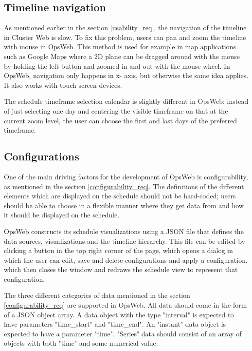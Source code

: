 \subsection{Timeline navigation} \label{opsweb_nav}
As mentioned earlier in the section \ref{usability_req}, the navigation of the timeline in Cluster Web is slow. To fix this problem, users can pan and zoom the timeline with mouse in OpsWeb. This method is used for example in map applications such as Google Maps where a 2D plane can be dragged around with the mouse by holding the left button and zoomed in and out with the mouse wheel. In OpsWeb, navigation only happens in x- axis, but otherwise the same idea applies. It also works with touch screen devices.

The schedule timeframe selection calendar is slightly different in OpsWeb; instead of just selecting one day and centering the visible timeframe on that at the current zoom level, the user can choose the first and last days of the preferred timeframe.

\subsection{Configurations} \label{opsweb_config}
One of the main driving factors for the development of OpsWeb is configurability, as mentioned in the section \ref{configurability_req}. The definitions of the different elements which are displayed on the schedule should not be hard-coded; users should be able to choose in a flexible manner where they get data from and how it should be displayed on the schedule.

OpsWeb constructs its schedule visualizations using a JSON file that defines the data sources, visualizations and the timeline hierarchy. This file can be edited by clicking a button in the top right corner of the page, which opens a dialog in which the user can edit, save and delete configurations and apply a configuration, which then closes the window and redraws the schedule view to represent that configuration.

The three different categories of data mentioned in the section \ref{configurability_req} are supported in OpsWeb. All data should come in the form of a JSON object array. A data object with the type "interval" is expected to have parameters "time\_start" and "time\_end". An "instant" data object is expected to have a parameter "time". "Series" data should consist of an array of objects with both "time" and some numerical value.

